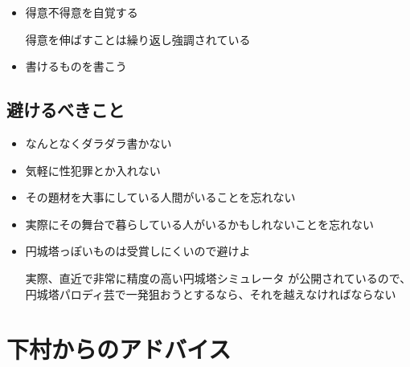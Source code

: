 \documentclass[10pt, a5paper, twoside]{jsarticle}
\theoremstyle{definition}
\begin{document}
			\begin{itemize}
				\item 得意不得意を自覚する\cite{nkm1}

				\vspace{1mm}

				得意を伸ばすことは繰り返し強調されている

				\vspace{2mm}

				\item 書けるものを書こう\cite{nkm1}

			\end{itemize}

		\subsection{避けるべきこと}

			\begin{itemize}
				\item なんとなくダラダラ書かない\cite{nkm2}

				\vspace{2mm}

				\item 気軽に性犯罪とか入れない\cite{nkm2}

				\vspace{2mm}

				\item その題材を大事にしている人間がいることを忘れない\cite{nkm2}

				\vspace{2mm}

				\item 実際にその舞台で暮らしている人がいるかもしれないことを忘れない\cite{nkm2}

				\vspace{2mm}

				\item 円城塔っぽいものは受賞しにくいので避けよ\cite{twi}

				\vspace{1mm}

				実際、直近で非常に精度の高い円城塔シミュレータ\cite{aki} が公開されているので、円城塔パロディ芸で一発狙おうとするなら、それを越えなければならない

			\end{itemize}

	\section{下村からのアドバイス}
\end{document}
